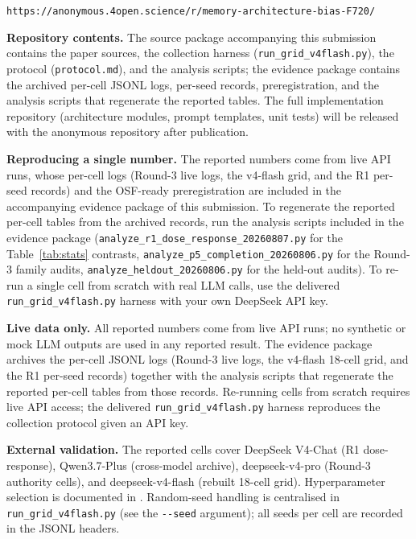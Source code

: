 \documentclass[11pt]{article}
\begin{document}
\begin{center}
\texttt{https://anonymous.4open.science/r/memory-architecture-bias-F720/}
\end{center}

\noindent\textbf{Repository contents.}
The source package accompanying this submission contains the paper sources, the collection harness (\texttt{run\_grid\_v4flash.py}), the protocol (\texttt{protocol.md}), and the analysis scripts; the evidence package contains the archived per-cell JSONL logs, per-seed records, preregistration, and the analysis scripts that regenerate the reported tables. The full implementation repository (architecture modules, prompt templates, unit tests) will be released with the anonymous repository after publication.

\noindent\textbf{Reproducing a single number.}
The reported numbers come from live API runs, whose per-cell logs (Round-3 live logs, the v4-flash grid, and the R1 per-seed records) and the OSF-ready preregistration are included in the accompanying evidence package of this submission. To regenerate the reported per-cell tables from the archived records, run the analysis scripts included in the evidence package (\texttt{analyze\_r1\_dose\_response\_20260807.py} for the Table~\ref{tab:stats} contrasts, \texttt{analyze\_p5\_completion\_20260806.py} for the Round-3 family audits, \texttt{analyze\_heldout\_20260806.py} for the held-out audits). To re-run a single cell from scratch with real LLM calls, use the delivered \texttt{run\_grid\_v4flash.py} harness with your own DeepSeek API key.

\noindent\textbf{Live data only.}
All reported numbers come from live API runs; no synthetic or mock LLM outputs are used in any reported result. The evidence package archives the per-cell JSONL logs (Round-3 live logs, the v4-flash 18-cell grid, and the R1 per-seed records) together with the analysis scripts that regenerate the reported per-cell tables from those records. Re-running cells from scratch requires live API access; the delivered \texttt{run\_grid\_v4flash.py} harness reproduces the collection protocol given an API key.

\noindent\textbf{External validation.}
The reported cells cover DeepSeek V4-Chat (R1 dose-response), Qwen3.7-Plus (cross-model archive), deepseek-v4-pro (Round-3 authority cells), and deepseek-v4-flash (rebuilt 18-cell grid). Hyperparameter selection is documented in . Random-seed handling is centralised in \texttt{run\_grid\_v4flash.py} (see the \texttt{-{}-seed} argument); all seeds per cell are recorded in the JSONL headers.
\end{document}
